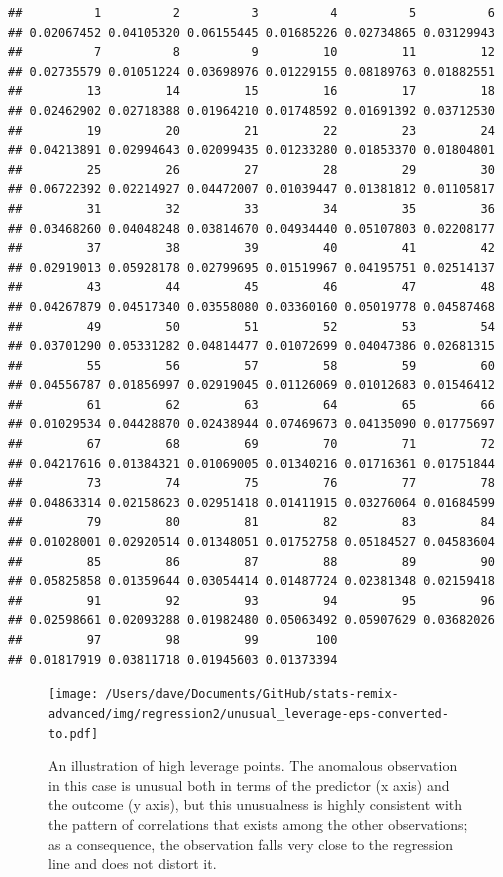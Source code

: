 \documentclass[
]{book}
\begin{document}
\begin{verbatim}
##          1          2          3          4          5          6 
## 0.02067452 0.04105320 0.06155445 0.01685226 0.02734865 0.03129943 
##          7          8          9         10         11         12 
## 0.02735579 0.01051224 0.03698976 0.01229155 0.08189763 0.01882551 
##         13         14         15         16         17         18 
## 0.02462902 0.02718388 0.01964210 0.01748592 0.01691392 0.03712530 
##         19         20         21         22         23         24 
## 0.04213891 0.02994643 0.02099435 0.01233280 0.01853370 0.01804801 
##         25         26         27         28         29         30 
## 0.06722392 0.02214927 0.04472007 0.01039447 0.01381812 0.01105817 
##         31         32         33         34         35         36 
## 0.03468260 0.04048248 0.03814670 0.04934440 0.05107803 0.02208177 
##         37         38         39         40         41         42 
## 0.02919013 0.05928178 0.02799695 0.01519967 0.04195751 0.02514137 
##         43         44         45         46         47         48 
## 0.04267879 0.04517340 0.03558080 0.03360160 0.05019778 0.04587468 
##         49         50         51         52         53         54 
## 0.03701290 0.05331282 0.04814477 0.01072699 0.04047386 0.02681315 
##         55         56         57         58         59         60 
## 0.04556787 0.01856997 0.02919045 0.01126069 0.01012683 0.01546412 
##         61         62         63         64         65         66 
## 0.01029534 0.04428870 0.02438944 0.07469673 0.04135090 0.01775697 
##         67         68         69         70         71         72 
## 0.04217616 0.01384321 0.01069005 0.01340216 0.01716361 0.01751844 
##         73         74         75         76         77         78 
## 0.04863314 0.02158623 0.02951418 0.01411915 0.03276064 0.01684599 
##         79         80         81         82         83         84 
## 0.01028001 0.02920514 0.01348051 0.01752758 0.05184527 0.04583604 
##         85         86         87         88         89         90 
## 0.05825858 0.01359644 0.03054414 0.01487724 0.02381348 0.02159418 
##         91         92         93         94         95         96 
## 0.02598661 0.02093288 0.01982480 0.05063492 0.05907629 0.03682026 
##         97         98         99        100 
## 0.01817919 0.03811718 0.01945603 0.01373394
\end{verbatim}

\begin{figure}
\centering
\texttt{[image: /Users/dave/Documents/GitHub/stats-remix-advanced/img/regression2/unusual\_leverage-eps-converted-to.pdf]}
\caption{\label{fig:leverage}An illustration of high leverage points. The anomalous observation in this case is unusual both in terms of the predictor (x axis) and the outcome (y axis), but this unusualness is highly consistent with the pattern of correlations that exists among the other observations; as a consequence, the observation falls very close to the regression line and does not distort it.}
\end{figure}
\end{document}
